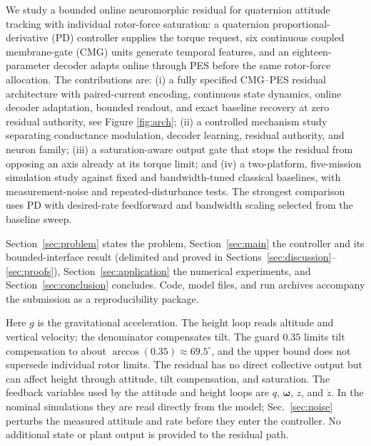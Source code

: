 We study a bounded online neuromorphic residual for quaternion attitude tracking with individual rotor-force saturation: a quaternion proportional-derivative (PD) controller supplies the torque request, six continuous coupled membrane-gate (CMG) units generate temporal features, and an eighteen-parameter decoder adapts online through PES before the same rotor-force allocation. The contributions are: (i) a fully specified CMG--PES residual architecture with paired-current encoding, continuous state dynamics, online decoder adaptation, bounded readout, and exact baseline recovery at zero residual authority, see Figure \ref{fig:arch}; (ii) a controlled mechanism study separating conductance modulation, decoder learning, residual authority, and neuron family; (iii) a saturation-aware output gate that stops the residual from opposing an axis already at its torque limit; and (iv) a two-platform, five-mission simulation study against fixed and bandwidth-tuned classical baselines, with measurement-noise and repeated-disturbance tests. The strongest comparison uses PD with desired-rate feedforward and bandwidth scaling selected from the baseline sweep.

Section~\ref{sec:problem} states the problem, Section~\ref{sec:main} the controller and its bounded-interface result (delimited and proved in Sections~\ref{sec:discussion}--\ref{sec:proofs}), Section~\ref{sec:application} the numerical experiments, and Section~\ref{sec:conclusion} concludes. Code, model files, and run archives accompany the submission as a reproducibility package.

Here $g$ is the gravitational acceleration. The height loop reads altitude and vertical velocity; the denominator compensates tilt.
The guard $0.35$ limits tilt compensation to about $\arccos(0.35)\approx69.5^\circ$, and the upper bound does
not supersede individual rotor limits. The residual has no direct collective
output but can affect height through attitude, tilt compensation, and
saturation.
The feedback variables used by the attitude and height loops are $q$, $\bm\omega$, $z$, and $\dot z$. In the nominal simulations they are read directly from the model; Sec.~\ref{sec:noise} perturbs the measured attitude and rate before they enter the controller. No additional state or plant output is provided to the residual path.

